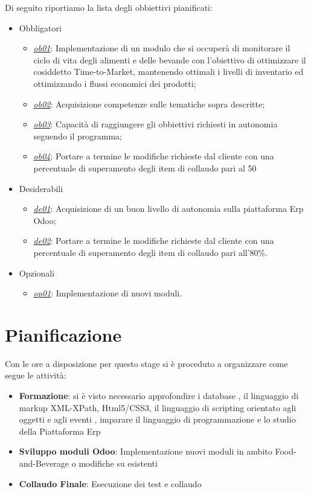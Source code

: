 Di seguito riportiamo la lista degli obbiettivi pianificati:
\begin{itemize}
	\item Obbligatori
	      \begin{itemize}
	      	\item \underline{\textit{ob01}}: Implementazione di un modulo che si occuperà di monitorare il ciclo di vita degli alimenti e delle bevande con l’obiettivo di ottimizzare il cosiddetto Time-to-Market, mantenendo ottimali i livelli di inventario ed ottimizzando i flussi economici dei prodotti;
	      	\item \underline{\textit{ob02}}: Acquisizione competenze sulle tematiche sopra descritte;
	      	\item \underline{\textit{ob03}}: Capacità di raggiungere gli obbiettivi richiesti in autonomia seguendo il programma;
	      	\item \underline{\textit{ob04}}: Portare a termine le modifiche richieste dal cliente con una percentuale di superamento degli item di collaudo pari al 50%
	      \end{itemize}
	\item Desiderabili
	      \begin{itemize}
	      	\item \underline{\textit{de01}}: Acquisizione di un buon livello di autonomia sulla piattaforma Erp Odoo;
	      	\item \underline{\textit{de02}}: Portare a termine le modifiche richieste dal cliente con una percentuale di superamento degli item di collaudo pari all’80\%.
	    
	      \end{itemize}
	\item Opzionali
	      \begin{itemize}
	      	\item \underline{\textit{op01}}: Implementazione di nuovi moduli.
	      \end{itemize} 
\end{itemize}

\section{Pianificazione}
Con le ore a disposizione per questo stage si è proceduto a organizzare come segue le attività:
\begin{itemize}
	\item \textbf{Formazione}: si è visto necessario approfondire i database , il linguaggio di markup XML-XPath, Html5/CSS3, il linguaggio di scripting orientato agli oggetti e agli eventi , imparare il linguaggio di programmazione  e lo studio della Piattaforma Erp 
	\item \textbf{Sviluppo moduli Odoo}: Implementazione nuovi moduli in ambito Food-and-Beverage o modifiche su esistenti
	\item \textbf{Collaudo Finale}: Esecuzione dei test e collaudo
\end{itemize}

